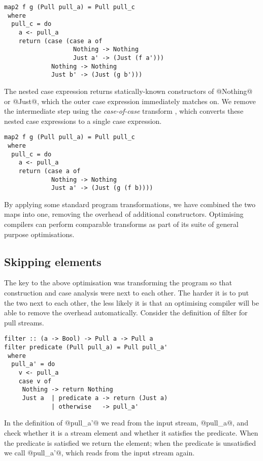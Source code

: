 \begin{lstlisting}
map2 f g (Pull pull_a) = Pull pull_c
 where
  pull_c = do
    a <- pull_a
    return (case (case a of
                   Nothing -> Nothing
                   Just a' -> (Just (f a')))
             Nothing -> Nothing
             Just b' -> (Just (g b')))
\end{lstlisting}

The nested case expression returns statically-known constructors of @Nothing@ or @Just@, which the outer case expression immediately matches on.
We remove the intermediate step using the \emph{case-of-case} transform \cite{jones1998transformation}, which converts these nested case expressions to a single case expression.


\begin{lstlisting}
map2 f g (Pull pull_a) = Pull pull_c
 where
  pull_c = do
    a <- pull_a
    return (case a of
             Nothing -> Nothing
             Just a' -> (Just (g (f b))))
\end{lstlisting}

By applying some standard program transformations, we have combined the two maps into one, removing the overhead of additional constructors.
Optimising compilers can perform comparable transforms as part of its suite of general purpose optimisations.

\subsection{Skipping elements}

The key to the above optimisation was transforming the program so that construction and case analysis were next to each other.
The harder it is to put the two next to each other, the less likely it is that an optimising compiler will be able to remove the overhead automatically.
Consider the definition of filter for pull streams.

\begin{lstlisting}
filter :: (a -> Bool) -> Pull a -> Pull a
filter predicate (Pull pull_a) = Pull pull_a'
 where
  pull_a' = do
    v <- pull_a
    case v of
     Nothing -> return Nothing
     Just a  | predicate a -> return (Just a)
             | otherwise   -> pull_a'
\end{lstlisting}

In the definition of @pull_a'@ we read from the input stream, @pull_a@, and check whether it is a stream element and whether it satisfies the predicate.
When the predicate is satisfied we return the element; when the predicate is unsatisfied we call @pull_a'@, which reads from the input stream again.

